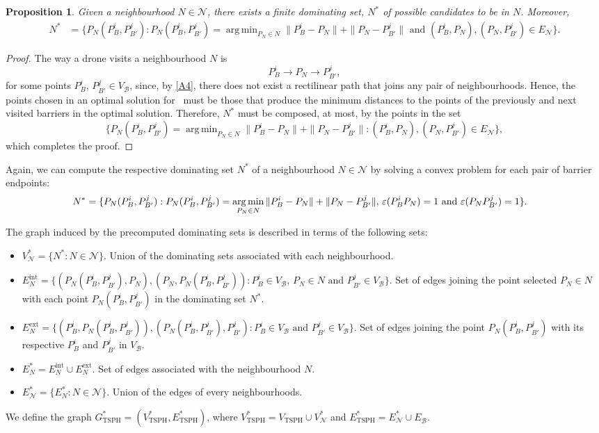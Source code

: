 \documentclass[a4paper,  review, authoryear, 1p.]{elsarticle}
\DeclareMathOperator*{\argmin}{arg\,min}
\newcommand{\TSPHN}{{\sf{H-TSPHN}\xspace }}
\newcommand{\VB}{{V^{}_{\mathcal B}}}
\newcommand{\EB}{{E^{}_{\mathcal B}}}
\newcommand{\EN}{{E^{}_{\mathcal N}}}
\newcommand{\VTSPH}{{V_{\text{TSPH}}}}
\newcommand{\GTSPHS}{{G^{*}_{\text{TSPH}}}}
\newcommand{\VTSPHS}{{V^{*}_{\text{TSPH}}}}
\newcommand{\ETSPHS}{{E^{*}_{\text{TSPH}}}}
\newtheorem{prop}{Proposition}
\begin{document}
		\begin{prop}
			Given a neighbourhood $N\in\mathcal N$, there exists a finite dominating set, $N^*$ of possible candidates to be in $N$. Moreover,
			\begin{align*}
				N^*&=\{P_N(P_{B}^i, P_{B'}^j):P_N(P_{B}^i, P_{B'}^j)=\argmin_{P_N\in N} \|P_B^i - P_N\| + \|P_N - P_{B'}^j\|\text{ and }(P_B^i, P_N), (P_N, P_{B'}^j)\in \EN\}.
			\end{align*}
		\end{prop}
		\begin{proof}
			The way a drone visits a neighbourhood $N$ is
			$$P_{B}^i\longrightarrow P_N\longrightarrow P_{B'}^j,$$
			for some points $P_B^i,\, P_{B'}^j\in \VB$, since, by \ref{A4}, there does not exist a rectilinear path that joins any pair of neighbourhoods. Hence, the points chosen in an optimal solution for \TSPHN \ must be those that produce the minimum distances to the points of the previously and next visited barriers in the optimal solution. Therefore, $N^*$ must be composed, at most, by the points in the set
			$$
			\{P_N(P_{B}^i, P_{B'}^j)=\argmin_{P_N\in N} \|P_B^i - P_N\| + \|P_N - P_{B'}^j\| :(P_B^i, P_N), (P_N, P_{B'}^j)\in \EN\},
			$$
			which completes the proof.
		\end{proof}
		Again, we can compute the respective dominating set $N^*$ of a neighbourhood $N\in\mathcal N$ by solving a convex problem for each pair of barrier endpoints: %
		\begin{align*}
			N^*&=\{P_N(P_{B}^i, P_{B'}^j):P_N(P_{B}^i, P_{B'}^j)=\argmin_{P_N\in N} \|P_B^i - P_N\| + \|P_N - P_{B'}^j\|,\,\varepsilonvar{P_B^i}{P_N} = 1 \text{ and } \varepsilonvar{P_N}{P_{B'}^j} = 1\}.
		\end{align*}
		
		
		The  graph induced by the precomputed dominating sets is described in terms of the following sets:
		\begin{itemize}
			\item $V_\mathcal N^*=\{N^*:N\in\mathcal N\}$. Union of the dominating sets associated with each neighbourhood.
			\item $E_N^{\text{int}}=\{(P_N(P_B^i, P_{B'}^j), P_N), (P_N, P_N(P_B^i, P_{B'}^j)) :P_B^i\in\VB,\,P_N\in N\text{ and }P_{B'}^j\in\VB\}.$ Set of edges joining the point selected $P_N\in N$ with each point $P_N(P_B^i, P_{B'}^j)$ in the dominating set $N^*$.
			\item $E_N^{\text{ext}}=\{(P_B^i, P_N(P_B^i, P_{B'}^j)), (P_N(P_B^i, P_{B'}^j), P_{B'}^j):P_B^i\in\VB\text{ and }P_{B'}^j\in\VB\}.$ Set of edges joining the point $P_N(P_B^i, P_{B'}^j)$ with its respective $P_B^i$ and $P_{B'}^j$ in $\VB$.
			\item $E_N^*=E_N^{\text{int}}\cup E_N^{\text{ext}}$. Set of edges associated with the neighbourhood $N$.
			\item $E_\mathcal N^*= \{E_N^*:N\in\mathcal N\}.$ Union of the edges of every neighbourhoods.
		\end{itemize}
		We define the graph $\GTSPHS=(\VTSPHS, \ETSPHS)$, where $\VTSPHS=\VTSPH\cup V^*_\mathcal N$ and $\ETSPHS=E^*_\mathcal N\cup\EB$.
		
\end{document}
